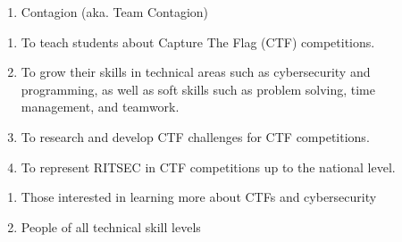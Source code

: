 

\begin{enumerate}
	\item Contagion (aka. Team Contagion)
\end{enumerate}


\begin{enumerate}
	\item To teach students about Capture The Flag (CTF) competitions.
	\item To grow their skills in technical areas such as cybersecurity and programming,
	      as well as soft skills such as problem solving, time management, and teamwork.
	\item To research and develop CTF challenges for CTF competitions.
	\item To represent RITSEC in CTF competitions up to the national level.
\end{enumerate}


\begin{enumerate}
	\item Those interested in learning more about CTFs and cybersecurity
	\item People of all technical skill levels
\end{enumerate}